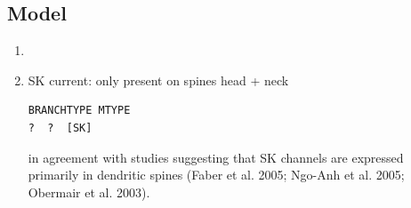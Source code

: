 \subsection{Model}

\begin{enumerate}
  \item 
  
  \item SK current: only present on spines head + neck
\begin{verbatim}
BRANCHTYPE MTYPE
?  ?  [SK] 
\end{verbatim}
  
  in agreement with studies suggesting that SK channels are expressed
primarily in dendritic spines (Faber et al. 2005; Ngo-Anh et al. 2005;
Obermair et al. 2003).


\end{enumerate}